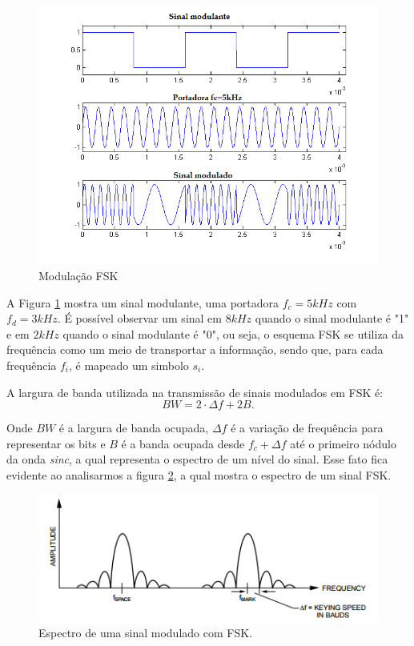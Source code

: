 \documentclass[12pt,a4paper]{article}%
\begin{document}
\begin{figure}[H]
    \centering
    \includegraphics[scale=0.9]{imagem/fsk.png}
    \caption{Modulação FSK}
    \label{fig:mdfsk}
\end{figure}

 A Figura \ref{fig:mdfsk} mostra um sinal modulante, uma portadora $f_c=5kHz$ com $f_d = 3kHz$.
 É possível observar um sinal em $8kHz$ quando o sinal modulante é "1" e em $2kHz$ quando o sinal modulante é "0", ou seja, o esquema FSK se utiliza da frequência como um meio de transportar a informação, sendo que, para cada frequência $f_i$, é mapeado um simbolo $s_i$.
 
A largura de banda utilizada na transmissão de sinais modulados em FSK é:
\[
    BW = 2\cdot \Delta f +2B.
\]

Onde $BW$ é a largura de banda ocupada, $\Delta f$ é a variação de frequência para representar os bits e $B$ é a banda ocupada desde  $f_c + \Delta f$ até o primeiro nódulo da onda \textit{sinc}, a qual representa o espectro de um nível do sinal. 
Esse fato fica evidente ao analisarmos a figura \ref{fig:bw}, a qual mostra o espectro de um sinal FSK.

\begin{figure}[H]
    \centering
    \includegraphics[scale=0.9]{imagem/bw}
    \caption{Espectro de uma sinal modulado com FSK.}
    \label{fig:bw}
\end{figure}
\end{document}
